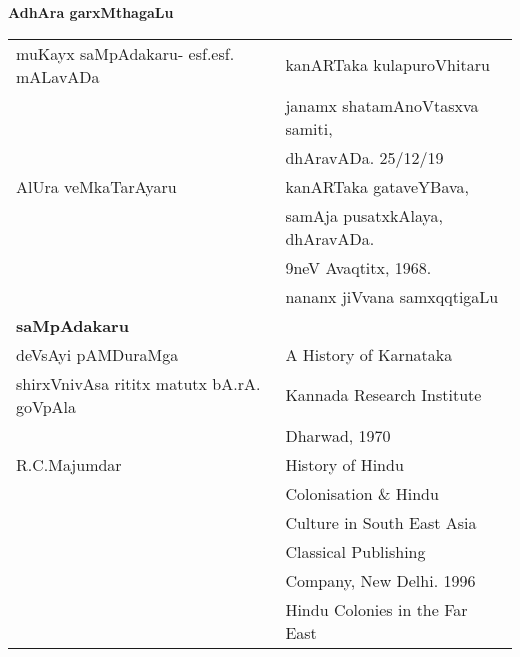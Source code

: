\documentclass[11pt,a4size]{article}
\begin{document}
\bigskip
\centerline{\textbf{\large{AdhAra garxMthagaLu}}}
\begin{center}
\begin{tabular}{l@{\hspace{.5cm}}l}
muKayx saMpAdakaru- esf.esf. mALavADa & kanARTaka kulapuroVhitaru\\
                                      & janamx shatamAnoVtasxva
                                        samiti,\\
				      & dhAravADa. 25/12/19\\[10pt]
AlUra veMkaTarAyaru                   & kanARTaka gataveYBava,\\
                                      & samAja pusatxkAlaya,
                                        dhAravADa.\\
				      & 9neV Avaqtitx, 1968.\\[5pt]
                                      & nananx jiVvana
                                        samxqqtigaLu\\[10pt]
\textbf{saMpAdakaru}                  &\\[2pt]
deVsAyi pAMDuraMga                    & {\footnotesize{\rm{A History
                                        of Karnataka}}}\\
shirxVnivAsa rititx matutx bA.rA. goVpAla & {\footnotesize{\rm{Kannada
                                      Research Institute}}}\\
                                      & {\footnotesize{\rm{Dharwad}}},
                                      1970\\[10pt]
{\footnotesize{\rm{R.C.Majumdar}}}    & {\footnotesize{\rm{History of
                                        Hindu}}}\\
                                      &
                                       {\footnotesize{\rm{Colonisation
                                        \& Hindu}}}\\
                                      & {\footnotesize{\rm{Culture in
                                        South East Asia}}}\\
                                      & {\footnotesize{\rm{Classical
                                        Publishing}}}\\
                                      & {\footnotesize{\rm{Company,
                                        New Delhi. 1996}}}\\[5pt]
                                      & {\footnotesize{\rm{Hindu
                                      Colonies in the Far East}}}\\

\end{tabular}
\end{center}
\end{document}
